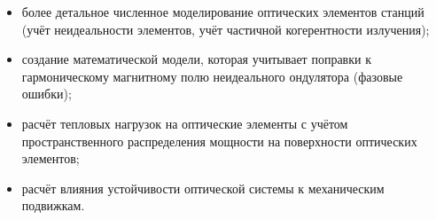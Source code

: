 \begin{itemize}
	\item более детальное численное моделирование оптических элементов станций (учёт неидеальности элементов, учёт частичной когерентности излучения);
	\item создание математической модели, которая учитывает поправки к гармоническому магнитному полю неидеального ондулятора (фазовые ошибки);
	\item расчёт тепловых нагрузок на оптические элементы с учётом пространственного распределения мощности на поверхности оптических элементов;
	\item расчёт влияния устойчивости оптической системы к механическим подвижкам.
\end{itemize}